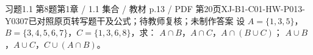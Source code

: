 \par\noindent\begin{minipage}{\linewidth}
\begin{bankitem}{习题1.1 第8题}{第1章 / 1.1 集合 / 教材 p.13 / PDF 第20页}{XJ-B1-C01-HW-P013-Y0307}{已对照原页转写题干及公式；待教师复核；未制作答案}
设 $A=\{1,3,5\}$，$B=\{3,4,5,6,7\}$，$C=\{1,3,6,8\}$，求：
$A\cap B$，$A\cap C$，$A\cap(B\cup C)$；
$A\cup B$，$A\cup C$，$C\cup(A\cap B)$。
\end{bankitem}
\end{minipage}\par\medskip
